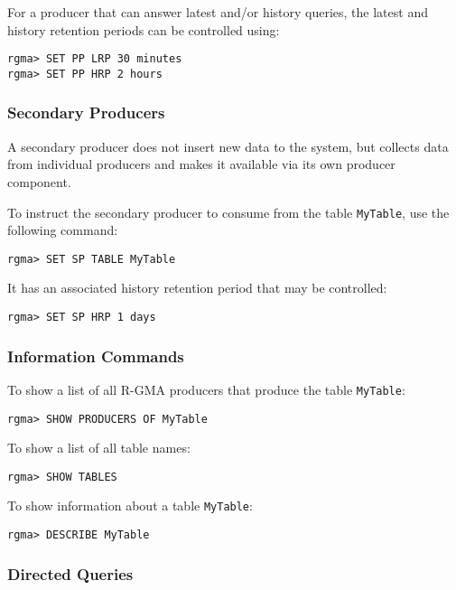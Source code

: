 For a producer that can answer latest and/or history queries, the
latest and history retention periods can be controlled using:

\begin{verbatim}
rgma> SET PP LRP 30 minutes
rgma> SET PP HRP 2 hours
\end{verbatim}

\subsubsection{Secondary Producers}

A secondary producer does not insert new data to the system, but
collects data from individual producers and makes it available via its
own producer component.

To instruct the secondary producer to consume from the table
\verb/MyTable/, use the following command:

\begin{verbatim}
rgma> SET SP TABLE MyTable
\end{verbatim}

It has an associated 
history retention period that may be controlled:

\begin{verbatim}
rgma> SET SP HRP 1 days
\end{verbatim}

\subsubsection{Information Commands}

To show a list of all R-GMA producers that produce the table \verb/MyTable/:
\begin{verbatim}
rgma> SHOW PRODUCERS OF MyTable
\end{verbatim}

To show a list of all table names:

\begin{verbatim}
rgma> SHOW TABLES
\end{verbatim}

To show information about a table \verb/MyTable/:

\begin{verbatim}
rgma> DESCRIBE MyTable
\end{verbatim}

\subsubsection{Directed Queries}


